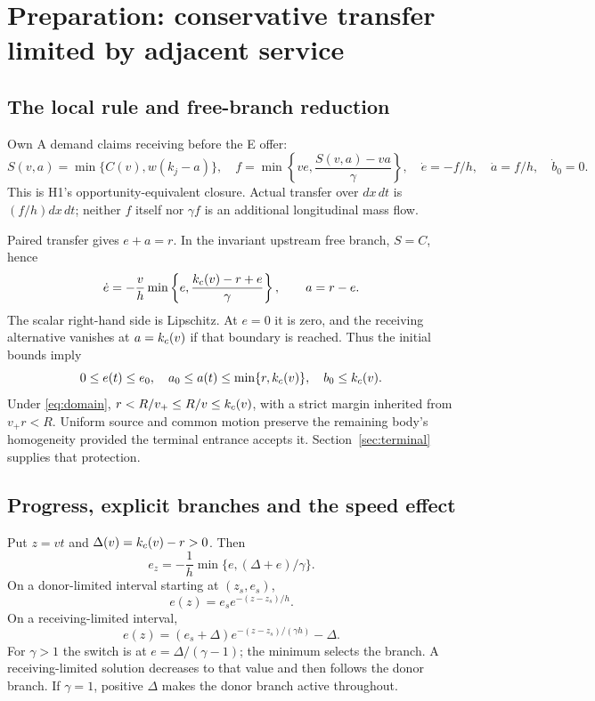 \section{Preparation: conservative transfer limited by adjacent service}
\label{sec:h1}
\subsection{The local rule and free-branch reduction}
Own A demand claims receiving before the E offer:
\begin{equation}
 S(v,a)=\min\{C(v),w(k_j-a)\},\quad
 f=\min\left\{ve,\frac{S(v,a)-va}{\gamma}\right\},\quad
 \dot e=-f/h,\quad\dot a=f/h,\quad\dot b_0=0.
 \label{eq:h1general}
\end{equation}
This is H1's opportunity-equivalent closure. Actual transfer over
$dx\,dt$ is $(f/h)dx\,dt$; neither $f$ itself nor $\gamma f$ is an
additional longitudinal mass flow.

Paired transfer gives $e+a=r$. In the invariant upstream free branch,
$S=C$, hence
\begin{equation}
 \dot e=-\frac vh\min\left\{e,
                     \frac{k_c(v)-r+e}{\gamma}\right\},\qquad a=r-e.
 \label{eq:h1time}
\end{equation}
The scalar right-hand side is Lipschitz. At $e=0$ it is zero, and the
receiving alternative vanishes at $a=k_c(v)$ if that boundary is reached.
Thus the initial bounds imply
\begin{equation}
 0\leq e(t)\leq e_0,\quad
 a_0\leq a(t)\leq\min\{r,k_c(v)\},\quad b_0\leq k_c(v).
 \label{eq:h1bounds}
\end{equation}
Under \eqref{eq:domain}, $r<R/v_+\leq R/v\leq k_c(v)$, with a strict
margin inherited from $v_+r<R$. Uniform source and common motion preserve
the remaining body's homogeneity provided the terminal entrance accepts it.
Section~\ref{sec:terminal} supplies that protection.

\subsection{Progress, explicit branches and the speed effect}
Put $z=vt$ and $\Delta(v)=k_c(v)-r>0$. Then
\begin{equation}
 e_z=-\frac1h\min\{e,(\Delta+e)/\gamma\}. \label{eq:h1progress}
\end{equation}
On a donor-limited interval starting at $(z_s,e_s)$,
\begin{equation}
 e(z)=e_s e^{-(z-z_s)/h}. \label{eq:h1donor}
\end{equation}
On a receiving-limited interval,
\begin{equation}
 e(z)=(e_s+\Delta)e^{-(z-z_s)/(\gamma h)}-\Delta.
 \label{eq:h1receiving}
\end{equation}
For $\gamma>1$ the switch is at $e=\Delta/(\gamma-1)$; the minimum
selects the branch. A receiving-limited solution decreases to that value
and then follows the donor branch. If $\gamma=1$, positive $\Delta$
makes the donor branch active throughout.

